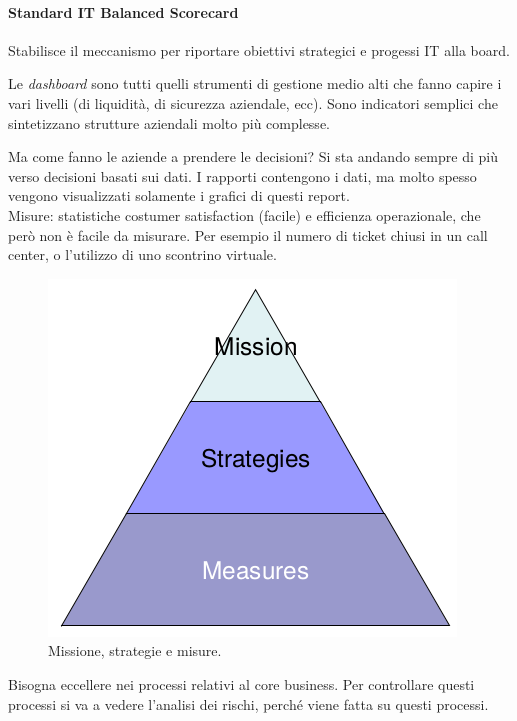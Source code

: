 \paragraph*{Standard IT Balanced Scorecard}

Stabilisce il meccanismo per riportare obiettivi strategici e progessi IT alla
board.

Le \textit{dashboard} sono tutti quelli strumenti di gestione medio alti che
fanno capire i vari livelli (di liquidità, di sicurezza aziendale, ecc). Sono
indicatori semplici che sintetizzano strutture aziendali molto più complesse.

Ma come fanno le aziende a prendere le decisioni? Si sta andando sempre di più
verso decisioni basati sui dati. I rapporti contengono i dati, ma molto spesso
vengono visualizzati solamente i grafici di questi report.\\
\newline
Misure: statistiche costumer satisfaction (facile) e efficienza operazionale,
che però non è facile da misurare. Per esempio il numero di ticket chiusi in un
call center, o l'utilizzo di uno scontrino virtuale.

\begin{figure}[H]
        \begin{center}
                \includegraphics[scale=0.5]{res/img/measures}
        \end{center}
        \caption{Missione, strategie e misure.}
\end{figure}

Bisogna eccellere nei processi relativi al core business. Per controllare questi
processi si va a vedere l'analisi dei rischi, perché viene fatta su questi
processi.

